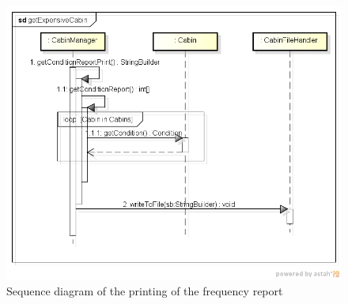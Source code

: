 \begin{figure}[H]
  \begin{center}
    \includegraphics[width=\textwidth]{gfx/print_frequency_report.png}
  \caption{Sequence diagram of the printing of the frequency report}
  \end{center}
\end{figure}